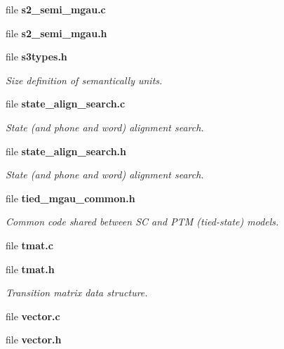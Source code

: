 \begin{DoxyCompactItemize}
file {\bfseries s2\+\_\+semi\+\_\+mgau.\+c}
\item 
file {\bfseries s2\+\_\+semi\+\_\+mgau.\+h}
\item 
file {\bf s3types.\+h}
\begin{DoxyCompactList}\small\item\em Size definition of semantically units. \end{DoxyCompactList}\item 
file {\bf state\+\_\+align\+\_\+search.\+c}
\begin{DoxyCompactList}\small\item\em State (and phone and word) alignment search. \end{DoxyCompactList}\item 
file {\bf state\+\_\+align\+\_\+search.\+h}
\begin{DoxyCompactList}\small\item\em State (and phone and word) alignment search. \end{DoxyCompactList}\item 
file {\bf tied\+\_\+mgau\+\_\+common.\+h}
\begin{DoxyCompactList}\small\item\em Common code shared between S\+C and P\+T\+M (tied-\/state) models. \end{DoxyCompactList}\item 
file {\bfseries tmat.\+c}
\item 
file {\bf tmat.\+h}
\begin{DoxyCompactList}\small\item\em Transition matrix data structure. \end{DoxyCompactList}\item 
file {\bfseries vector.\+c}
\item 
file {\bfseries vector.\+h}
\end{DoxyCompactItemize}
